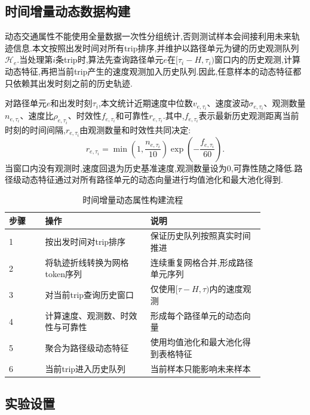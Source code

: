\documentclass{rjthesis}
\begin{document}
\subsection{时间增量动态数据构建}

动态交通属性不能使用全量数据一次性分组统计,否则测试样本会间接利用未来轨迹信息.本文按照出发时间对所有trip排序,并维护以路径单元为键的历史观测队列$\mathcal{H}_e$.当处理第$i$条trip时,算法先查询路径单元$e$在$[\tau_i-H,\tau_i)$窗口内的历史观测,计算动态特征,再把当前trip产生的速度观测加入历史队列.因此,任意样本的动态特征都只依赖其出发时刻之前的历史轨迹.

对路径单元$e$和出发时刻$\tau_i$,本文统计近期速度中位数$v_{e,\tau_i}$、速度波动$\sigma_{e,\tau_i}$、观测数量$n_{e,\tau_i}$、速度比$\rho_{e,\tau_i}$、时效性$f_{e,\tau_i}$和可靠性$r_{e,\tau_i}$.其中,$f_{e,\tau_i}$表示最新历史观测距离当前时刻的时间间隔,$r_{e,\tau_i}$由观测数量和时效性共同决定:
\begin{equation}
	r_{e,\tau_i}=\min\left(1,\frac{n_{e,\tau_i}}{10}\right)\exp\left(-\frac{f_{e,\tau_i}}{60}\right).
\end{equation}
当窗口内没有观测时,速度回退为历史基准速度,观测数量设为0,可靠性随之降低.路径级动态特征通过对所有路径单元的动态向量进行均值池化和最大池化得到.

\begin{table}[htbp]
	\centering
	\caption{时间增量动态属性构建流程}
	\label{tab:algorithm}
	\begin{tabular}{p{0.12\linewidth}p{0.35\linewidth}p{0.38\linewidth}}
		\toprule
		步骤 & 操作 & 说明 \\
		\midrule
		1 & 按出发时间对trip排序 & 保证历史队列按照真实时间推进 \\
		2 & 将轨迹折线转换为网格token序列 & 连续重复网格合并,形成路径单元序列 \\
		3 & 对当前trip查询历史窗口 & 仅使用$[\tau-H,\tau)$内的速度观测 \\
		4 & 计算速度、观测数、时效性与可靠性 & 形成每个路径单元的动态向量 \\
		5 & 聚合为路径级动态特征 & 使用均值池化和最大池化得到表格特征 \\
		6 & 当前trip进入历史队列 & 当前样本只能影响未来样本 \\
		\bottomrule
	\end{tabular}
\end{table}

\subsection{实验设置}
\end{document}
